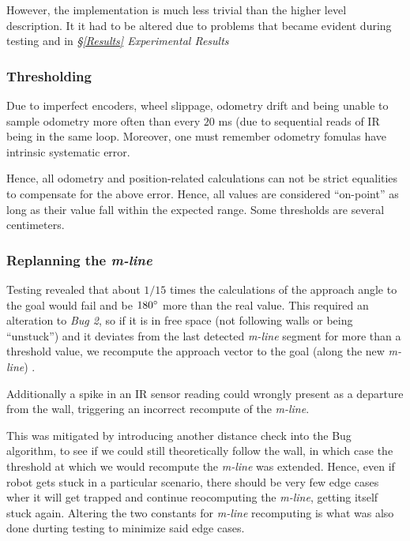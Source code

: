 \documentclass[11pt, a4paper]{article}
\begin{document}
However, the implementation is much less trivial than the higher level description. It it had 
to be altered due to problems that became evident during testing and in \textit{\S\ref{Results} Experimental Results}



\subsubsection{Thresholding}

Due to imperfect encoders, wheel slippage, odometry drift and being unable to sample odometry 
more often than every $20$ ms\cite{khepera_manual} (due to sequential 
reads of IR being in the same loop. Moreover, one must remember odometry fomulas have intrinsic 
systematic error.

Hence, all odometry and position-related calculations can not be strict equalities to compensate 
for the above error. Hence, all values are considered ``on-point'' as long as their value
fall within the expected range. Some thresholds are several centimeters.



\subsubsection{Replanning the \textit{m-line}}


Testing revealed that about $1/15$ times the calculations of the approach angle to the goal would 
fail and be $180\degree$ more than the real value. This required an alteration to \textit{Bug 2}, 
so if it is in free space (not following walls or being ``unstuck''\cite{task1_report}) and it 
deviates from the last detected \textit{m-line} segment for more than a threshold value, we 
recompute the approach vector to the goal (along the new \textit{m-line}) .

Additionally a spike in an IR sensor reading could wrongly present as a departure from the wall,
triggering an incorrect recompute of the \textit{m-line}.

This was mitigated by introducing another distance check into the Bug algorithm, to see if
we could still theoretically follow the wall, in which case the threshold at which we would 
recompute the \textit{m-line} was extended. Hence, even if robot gets stuck in a particular 
scenario, there should be very few edge cases wher it will get trapped and continue reocomputing
 the \textit{m-line}, getting itself stuck again. Altering the two constants for \textit{m-line}
 recomputing is what was also done durting testing to minimize said edge cases.
\end{document}

